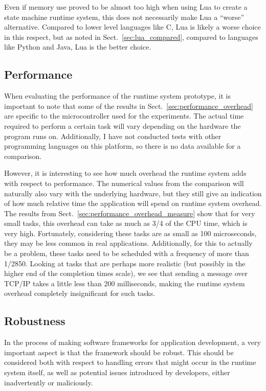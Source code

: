 Even if memory use proved to be almost too high when using Lua to create a state machine runtime system, this does not necessarily make Lua a ``worse'' alternative. Compared to lower level languages like C, Lua is likely a worse choice in this respect, but as noted in Sect.~\ref{sec:lua_compared}, compared to languages like Python and Java, Lua is the better choice. 

\subsection{Performance}
\label{sec:disq_performance}
When evaluating the performance of the runtime system prototype, it is important to note that some of the results in Sect.~\ref{sec:performance_overhead} are specific to the microcontroller used for the experiments. The actual time required to perform a certain task will vary depending on the hardware the program runs on. Additionally, I have not conducted tests with other programming languages on this platform, so there is no data available for a comparison.

However, it is interesting to see how much overhead the runtime system adds with respect to performance. The numerical values from the comparison will naturally also vary with the underlying hardware, but they still give an indication of how much relative time the application will spend on runtime system overhead. The results from Sect.~\ref{sec:performance_overhead_measure} show that for very small tasks, this overhead can take as much as 3/4 of the CPU time, which is very high. Fortunately, considering these tasks are as small as 100 microseconds, they may be less common in real applications. Additionally, for this to actually be a problem, these tasks need to be scheduled with a frequency of more than 1/2850. Looking at tasks that are perhaps more realistic (but possibly in the higher end of the completion times scale), we see that sending a message over TCP/IP takes a little less than 200 milliseconds, making the runtime system overhead completely insignificant for such tasks.

\subsection{Robustness}
\label{sec:disq_robustness}
In the process of making software frameworks for application development, a very important aspect is that the framework should be robust. This should be considered both with respect to handling errors that might occur in the runtime system itself, as well as potential issues introduced by developers, either inadvertently or maliciously.

